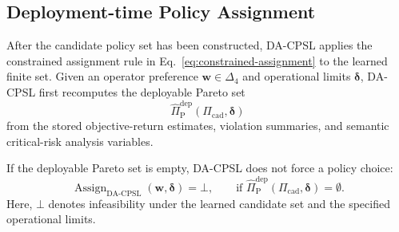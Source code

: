 \documentclass[sigconf,review,anonymous]{acmart}
\begin{document}
\subsection{Deployment-time Policy Assignment}
\label{subsec:dacpsl-operational-assignment}

After the candidate policy set has been constructed, DA-CPSL applies the
constrained assignment rule in Eq.~\ref{eq:constrained-assignment} to the
learned finite set. Given an operator preference
\(\mathbf{w}\in\Delta_4\) and operational limits
\(\boldsymbol{\delta}\), DA-CPSL first recomputes the deployable Pareto
set
\[
\widehat{\Pi}_{\mathrm{P}}^{\mathrm{dep}}
(\Pi_{\mathrm{cad}},\boldsymbol{\delta})
\]
from the stored objective-return estimates, violation summaries, and
semantic critical-risk analysis variables.


If the deployable Pareto set is empty, DA-CPSL does not force a policy
choice:
\begin{equation}
\operatorname{Assign}_{\mathrm{DA\mbox{-}CPSL}}
(\mathbf{w},\boldsymbol{\delta})
=
\bot,
\qquad
\text{if }
\widehat{\Pi}_{\mathrm{P}}^{\mathrm{dep}}
(\Pi_{\mathrm{cad}},\boldsymbol{\delta})
=
\emptyset .
\label{eq:dacpsl-infeasible-assignment}
\end{equation}
Here, \(\bot\) denotes infeasibility under the learned candidate set and
the specified operational limits.
\end{document}
